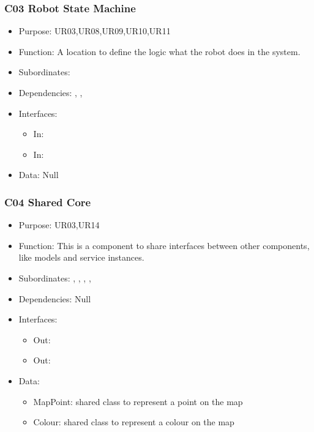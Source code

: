 \subsubsection{C03 Robot State Machine} \label{compState}
\begin{itemize}
	\item Purpose: UR03,UR08,UR09,UR10,UR11
	\item Function: A location to define the logic what the robot does in the system.
	\item Subordinates: 
	\item Dependencies: , , 
	\item Interfaces:
	\begin{itemize}
		\item In: \texttt{}
		\item In: \texttt{}
	\end{itemize}
	\item Data: Null
\end{itemize}

\subsubsection{C04 Shared Core} \label{compShared}
\begin{itemize}
	\item Purpose: UR03,UR14
	\item Function: This is a component to share interfaces between other components, like models and service instances.
	\item Subordinates: , , , , 
	\item Dependencies: Null
	\item Interfaces:
	\begin{itemize}
		\item Out: \texttt{}
		\item Out: \texttt{}
	\end{itemize}
	\item Data:
	\begin{itemize}
		\item MapPoint: shared class to represent a point on the map
		\item Colour: shared class to represent a colour on the map
	\end{itemize}
\end{itemize}

